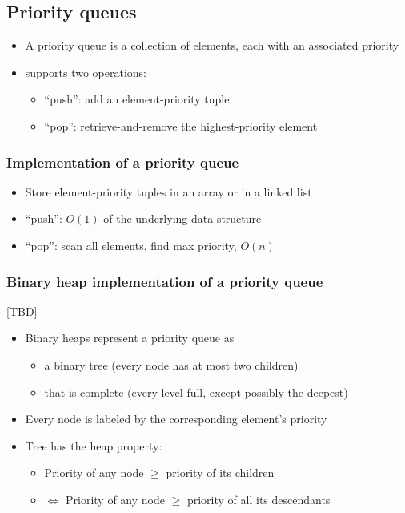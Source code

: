 \documentclass[12pt]{article}
\begin{document}
\subsection{Priority queues}

\begin{itemize}
    \item A priority queue is a collection of elements, each with an associated priority
    \item supports two operations:
    \begin{itemize}
        \item ``push'': add an element-priority tuple
        \item ``pop'': retrieve-and-remove the highest-priority element
    \end{itemize}
\end{itemize}

\subsubsection{Implementation of a priority queue}

\begin{itemize}
    \item Store element-priority tuples in an array or in a linked list
    \item ``push'': \(O(1)\) of the underlying data structure
    \item ``pop'': scan all elements, find max priority, \(O(n)\)
\end{itemize}

\subsubsection{Binary heap implementation of a priority queue}

[TBD]

\begin{itemize}
    \item Binary heaps represent a priority queue as
    \begin{itemize}
        \item a binary tree (every node has at most two children)
        \item that is complete (every level full, except possibly the deepest)
    \end{itemize}
    \item Every node is labeled by the corresponding element’s priority
    \item Tree has the heap property:
    \begin{itemize}
        \item Priority of any node \( \geq \) priority of its children
        \item \( \Leftrightarrow \) Priority of any node \( \geq \) priority of all its descendants
    \end{itemize}
\end{itemize}
\end{document}
